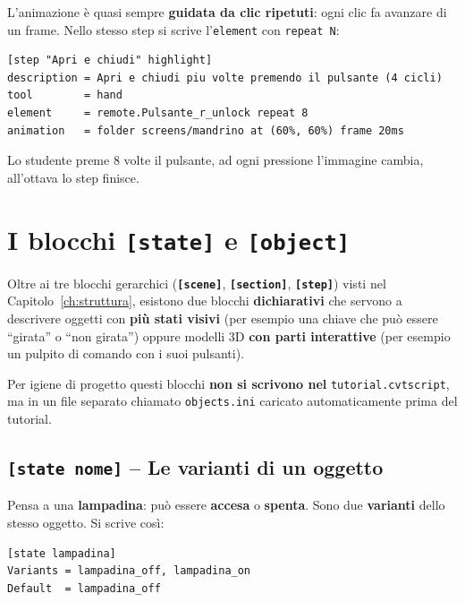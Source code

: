 ﻿\documentclass[a4paper,12pt,oneside]{book}
\newcommand{\kw}[1]{\texttt{\color{keycolor}#1}}
\newcommand{\val}[1]{\texttt{\color{cvtgreen}#1}}
\newcommand{\sez}[1]{\texttt{\color{sectioncolor}\textbf{#1}}}
\newcommand{\file}[1]{\texttt{#1}}
\begin{document}
\begin{notablu}
L'animazione è quasi sempre \textbf{guidata da clic ripetuti}: ogni clic fa
avanzare di un frame. Nello stesso step si scrive l'\kw{element} con
\val{repeat N}:

\begin{lstlisting}
[step "Apri e chiudi" highlight]
description = Apri e chiudi piu volte premendo il pulsante (4 cicli)
tool        = hand
element     = remote.Pulsante_r_unlock repeat 8
animation   = folder screens/mandrino at (60%, 60%) frame 20ms
\end{lstlisting}

Lo studente preme 8 volte il pulsante, ad ogni pressione l'immagine cambia,
all'ottava lo step finisce.
\end{notablu}

\chapter{I blocchi \texttt{[state]} e \texttt{[object]}}
\label{ch:state-object}

Oltre ai tre blocchi gerarchici (\sez{[scene]}, \sez{[section]},
\sez{[step]}) visti nel Capitolo~\ref{ch:struttura}, esistono due blocchi
\textbf{dichiarativi} che servono a descrivere oggetti con \textbf{più stati
visivi} (per esempio una chiave che può essere ``girata'' o ``non girata'')
oppure modelli 3D \textbf{con parti interattive} (per esempio un pulpito di
comando con i suoi pulsanti).

Per igiene di progetto questi blocchi \textbf{non si scrivono nel}
\file{tutorial.cvtscript}, ma in un file separato chiamato
\file{objects.ini} caricato automaticamente prima del tutorial.

\section{\texttt{[state nome]} -- Le varianti di un oggetto}

Pensa a una \textbf{lampadina}: può essere \textbf{accesa} o \textbf{spenta}.
Sono due \textbf{varianti} dello stesso oggetto. Si scrive così:

\begin{lstlisting}
[state lampadina]
Variants = lampadina_off, lampadina_on
Default  = lampadina_off
\end{lstlisting}
\end{document}
